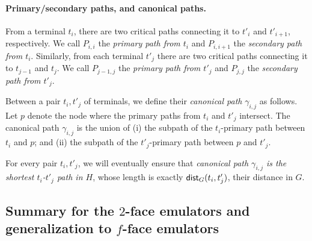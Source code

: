 \documentclass[11pt]{article}
\newcommand{\dist}{\textnormal{\textsf{dist}}}
\begin{document}

\paragraph{Primary/secondary paths, and canonical paths.}
From a terminal $t_i$, there are two critical paths connecting it to $t'_i$ and $t'_{i+1}$, respectively. We call $P_{i,i}$ the \emph{primary path from $t_i$} and $P_{i,i+1}$ the \emph{secondary path from $t_i$}. Similarly, from each terminal $t'_j$ there are two critical paths connecting it to $t_{j-1}$ and $t_{j}$. We call $P_{j-1,j}$ the \emph{primary path from $t'_j$} and $P_{j,j}$ the \emph{secondary path from $t'_j$}. %

Between a pair $t_i, t'_j$ of terminals, we define their \emph{canonical path} $\gamma_{i,j}$ as follows. Let $p$ denote the node where the primary paths from $t_i$ and $t'_j$ intersect. The canonical path $\gamma_{i,j}$ is the union of (i) the subpath of the $t_i$-primary path between $t_i$ and $p$; and (ii) the subpath of the $t'_j$-primary path between $p$ and $t'_j$. 

For every pair $t_i, t'_j$, we will eventually ensure that \emph{canonical path $\gamma_{i,j}$ is the shortest $t_i$-$t'_j$ path in $H$}, whose length is exactly $\dist_G(t_i,t'_j)$, their distance in $G$. 


\subsection*{Summary for the $2$-face emulators and generalization to $f$-face emulators}
\end{document}
